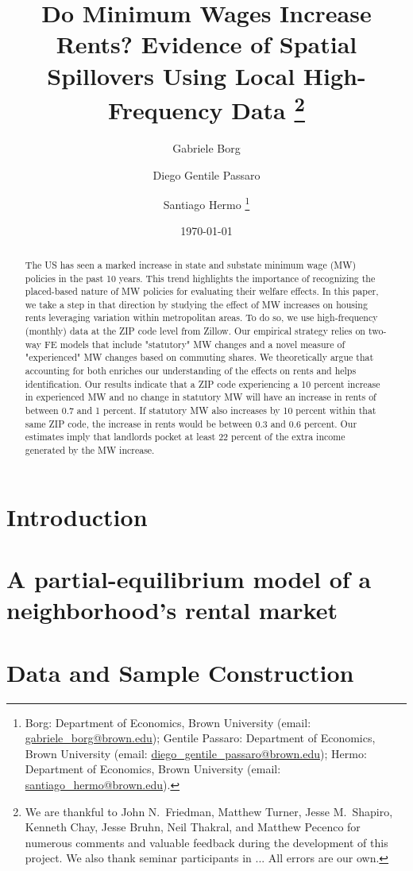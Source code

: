 \documentclass{article}
\title{ Do Minimum Wages Increase Rents? 
        Evidence of Spatial Spillovers Using Local High-Frequency Data
        \thanks{We are thankful to John N.\ Friedman, Matthew Turner, Jesse M.\ Shapiro, 
        Kenneth Chay, Jesse Bruhn, Neil Thakral, and Matthew Pecenco for numerous 
        comments and valuable feedback during the development of this project.
        We also thank seminar participants in ... %
        All errors are our own.}}
\author{Gabriele Borg \and Diego Gentile Passaro \and Santiago Hermo
        \footnote{
        Borg: Department of Economics, Brown University 
        (email: \url{gabriele_borg@brown.edu}); 
        Gentile Passaro: Department of Economics, Brown University 
        (email: \url{diego_gentile_passaro@brown.edu}); 
        Hermo: Department of Economics, Brown University 
        (email: \url{santiago_hermo@brown.edu}).}}
\date{\today}
\begin{document}
\maketitle

\begin{abstract}
    \noindent
    The US has seen a marked increase in state and substate minimum wage (MW) policies in 
    the past 10 years. This trend highlights the importance of recognizing the placed-based 
    nature of MW policies for evaluating their welfare effects. In this paper, we take a 
    step in that direction by studying the effect of MW increases on housing rents leveraging 
    variation within metropolitan areas. To do so, we use high-frequency (monthly) data at 
    the ZIP code level from Zillow. Our empirical strategy relies on two-way FE models that 
    include "statutory" MW changes and a novel measure of "experienced" MW changes based on 
    commuting shares. We theoretically argue that accounting for both enriches our understanding 
    of the effects on rents and helps identification. Our results indicate that a ZIP code 
    experiencing a 10 percent increase in experienced MW and no change in statutory MW will 
    have an increase in rents of between 0.7 and 1 percent. If statutory MW also increases 
    by 10 percent within that same ZIP code, the increase in rents would be between 0.3 and 0.6 
    percent. Our estimates imply that landlords pocket at least 22 percent of the extra income 
    generated by the MW increase.
\end{abstract}

\vspace{5mm}


\clearpage

\section{Introduction}\label{sec:intro}
    

\section{A partial-equilibrium model of a neighborhood's rental market}\label{sec:data}
	

\section{Data and Sample Construction}\label{sec:data}
	
\end{document}
